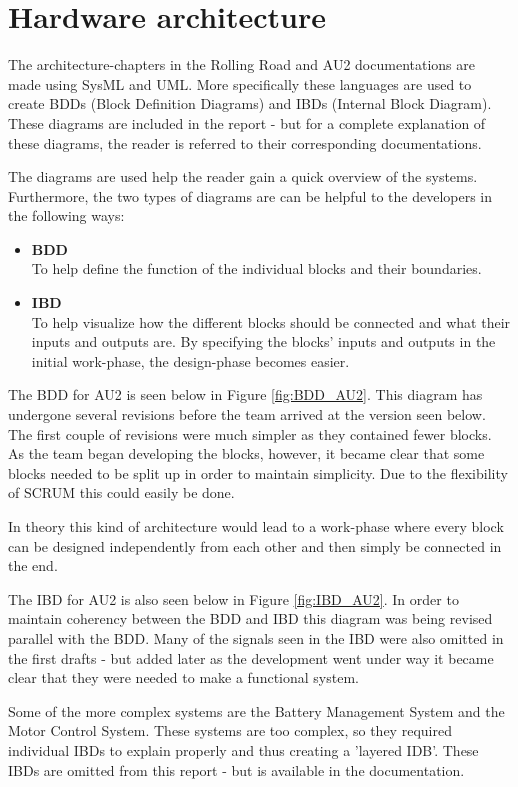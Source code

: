 \chapter{Hardware architecture}
The architecture-chapters in the Rolling Road and AU2 documentations are made using SysML and UML. More specifically these languages are used to create BDDs (Block Definition Diagrams) and IBDs (Internal Block Diagram). These diagrams are included in the report - but for a complete explanation of these diagrams, the reader is referred to their corresponding documentations\cite{RR}\citealp{AU2}.

The diagrams are used help the reader gain a quick overview of the systems. Furthermore, the two types of diagrams are can be helpful to the developers in the following ways:
\begin{itemize}
	\item \textbf{BDD}\\
	To help define the function of the individual blocks and their boundaries. 
	\item \textbf{IBD}\\
	To help visualize how the different blocks should be connected and what their inputs and outputs are. By specifying the blocks' inputs and outputs in the initial work-phase, the design-phase becomes easier.
\end{itemize}

The BDD for AU2 is seen below in Figure \vref{fig:BDD_AU2}. This diagram has undergone several revisions before the team arrived at the version seen below. The first couple of revisions were much simpler as they contained fewer blocks. As the team began developing the blocks, however, it became clear that some blocks needed to be split up in order to maintain simplicity. Due to the flexibility of SCRUM this could easily be done.

In theory this kind of architecture would lead to a work-phase where every block can be designed independently from each other and then simply be connected in the end.

The IBD for AU2 is also seen below in Figure \vref{fig:IBD_AU2}. In order to maintain coherency between the BDD and IBD this diagram was being revised parallel with the BDD. Many of the signals seen in the IBD were also omitted in the first drafts - but added later as the development went under way it became clear that they were needed to make a functional system.

Some of the more complex systems are the Battery Management System and the Motor Control System. These systems are too complex, so they required individual IBDs to explain properly and thus creating a 'layered IDB'. These IBDs are omitted from this report - but is available in the documentation\cite{AU2}.


